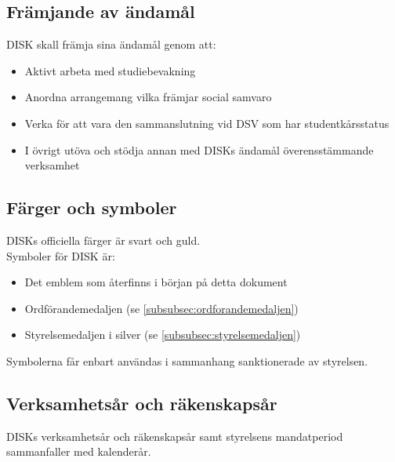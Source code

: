         \subsection{Främjande av ändamål}
        \label{subsec:framjandeavandamal}
                DISK skall främja sina ändamål genom att:
                \begin{itemize}
                \setlength{\itemsep}{0.0cm}
                \setlength{\parskip}{0.0cm}
                        \item Aktivt arbeta med studiebevakning
                        \item Anordna arrangemang vilka främjar social samvaro
                        \item Verka för att vara den sammanslutning vid DSV som har studentkårsstatus
                        \item I övrigt utöva och stödja annan med DISKs ändamål överensstämmande verksamhet
                \end{itemize}

        \subsection{Färger och symboler}
        \label{subsec:symboler}
                DISKs officiella färger är svart och guld.\\
                Symboler för DISK är:
                \begin{itemize}
                \setlength{\itemsep}{0.0cm}
                \setlength{\parskip}{0.0cm}
                        \item Det emblem som återfinns i början på detta dokument
                        \item Ordförandemedaljen (se \ref{subsubsec:ordforandemedaljen})
                        \item Styrelsemedaljen i silver (se \ref{subsubsec:styrelsemedaljen})
                \end{itemize}

                Symbolerna får enbart användas i sammanhang sanktionerade av styrelsen.

        \subsection{Verksamhetsår och räkenskapsår}
        \label{subsec:verksamhetsarochrakenskapsar}
                DISKs verksamhetsår och räkenskapsår samt styrelsens mandatperiod sammanfaller med kalenderår.
